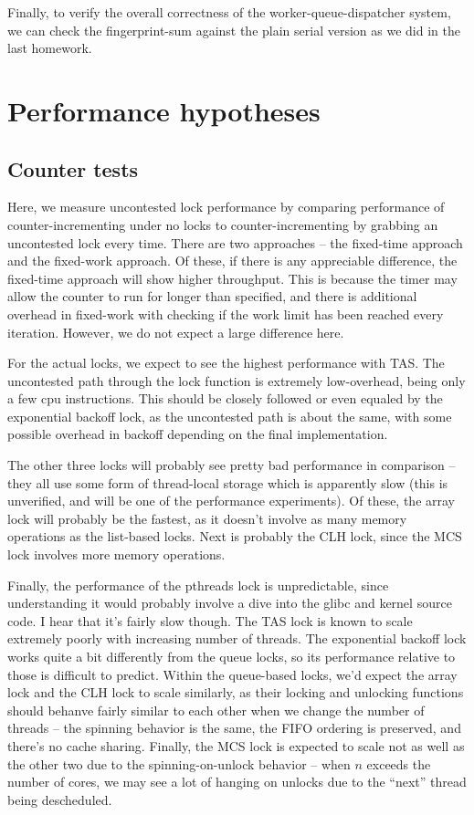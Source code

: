 \documentclass{article}
\begin{document}
Finally, to verify the overall correctness of the worker-queue-dispatcher system, we can check the fingerprint-sum against the plain serial version as we did in the last homework.
\section*{Performance hypotheses}
\subsection*{Counter tests}
Here, we measure uncontested lock performance by comparing performance of counter-incrementing under no locks to counter-incrementing by grabbing an uncontested lock every time. There are two approaches -- the fixed-time approach and the fixed-work approach. Of these, if there is any appreciable difference, the fixed-time approach will show higher throughput. This is because the timer may allow the counter to run for longer than specified, and there is additional overhead in fixed-work with checking if the work limit has been reached every iteration. However, we do not expect a large difference here.

For the actual locks, we expect to see the highest performance with TAS. The uncontested path through the lock function is extremely low-overhead, being only a few cpu instructions. This should be closely followed or even equaled by the exponential backoff lock, as the uncontested path is about the same, with some possible overhead in backoff depending on the final implementation.

The other three locks will probably see pretty bad performance in comparison -- they all use some form of thread-local storage which is apparently slow (this is unverified, and will be one of the performance experiments). Of these, the array lock will probably be the fastest, as it doesn't involve as many memory operations as the list-based locks. Next is probably the CLH lock, since the MCS lock involves more memory operations.

Finally, the performance of the pthreads lock is unpredictable, since understanding it would probably involve a dive into the glibc and kernel source code. I hear that it's fairly slow though.
The TAS lock is known to scale extremely poorly with increasing number of threads. The exponential backoff lock works quite a bit differently from the queue locks, so its performance relative to those is difficult to predict. Within the queue-based locks, we'd expect the array lock and the CLH lock to scale similarly, as their locking and unlocking functions should behanve fairly similar to each other when we change the number of threads -- the spinning behavior is the same, the FIFO ordering is preserved, and there's no cache sharing. Finally, the MCS lock is expected to scale not as well as the other two due to the spinning-on-unlock behavior -- when $n$ exceeds the number of cores, we may see a lot of hanging on unlocks due to the ``next'' thread being descheduled.
\end{document}
